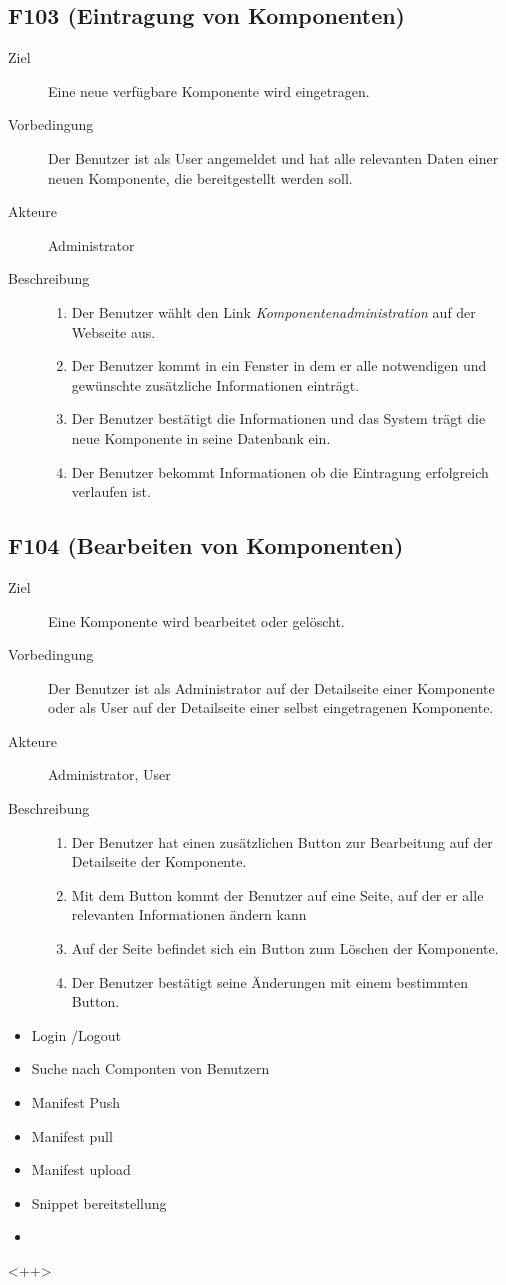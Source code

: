 \subsection{F103 (Eintragung von Komponenten)}
\label{F:Eintragen}
\begin{description}
  \item[Ziel]Eine neue verfügbare Komponente wird eingetragen.
  \item[Vorbedingung]Der Benutzer ist als User angemeldet und hat alle
	relevanten Daten einer neuen Komponente, die bereitgestellt werden soll.
  \item[Akteure]Administrator
   \item[Beschreibung]\hfill
    \begin{enumerate}
      \item Der Benutzer wählt den Link \emph{Komponentenadministration} auf der Webseite aus.
	  \item Der Benutzer kommt in ein Fenster in dem er alle notwendigen und
		gewünschte zusätzliche Informationen einträgt.
	  \item Der Benutzer bestätigt die Informationen und das System trägt die
		neue Komponente in seine Datenbank ein.
	  \item Der Benutzer bekommt Informationen ob die Eintragung erfolgreich
		verlaufen ist.
    \end{enumerate}
\end{description}


\subsection{F104 (Bearbeiten von Komponenten)}
\label{F:Bearbeiten}
\begin{description}
  \item[Ziel]Eine Komponente wird bearbeitet oder gelöscht.
  \item[Vorbedingung]Der Benutzer ist als Administrator auf der Detailseite
	einer Komponente oder als User auf der Detailseite einer selbst eingetragenen
	Komponente.
  \item[Akteure]Administrator, User
   \item[Beschreibung]\hfill
    \begin{enumerate}
      \item Der Benutzer hat einen zusätzlichen Button zur Bearbeitung auf der
		Detailseite der Komponente.
	  \item Mit dem Button kommt der Benutzer auf eine Seite, auf der er alle
		relevanten Informationen ändern kann
	  \item Auf der Seite befindet sich ein Button zum Löschen der Komponente.
	  \item Der Benutzer bestätigt seine Änderungen mit einem bestimmten
		Button.
    \end{enumerate}
\end{description}

\begin{itemize}
	\item Login /Logout
	\item Suche nach Componten von Benutzern
	\item Manifest Push
	\item Manifest pull
	\item Manifest upload
	\item Snippet bereitstellung
	\item 
\end{itemize}<++>

